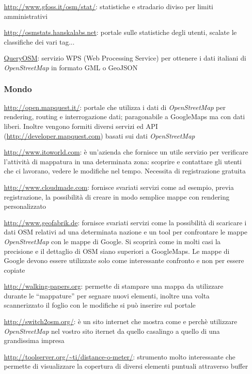 \documentclass[a4paper,twoside,12pt,]{article}
\newcommand{\osm}{\emph{OpenStreetMap}\xspace}
\begin{document}
\url{http://www.gfoss.it/osm/stat/}: statistiche e stradario diviso per limiti amministrativi

\url{http://osmstats.hanskalabs.net}: portale sulle statistiche degli utenti, scalate le classifiche dei vari tag...

\href{http://geodati.fmach.it/gfoss_geodata/osm/}{QueryOSM}: servizio WPS (Web Processing Service) per ottenere i dati italiani di \osm in formato GML o GeoJSON

\subsubsection{Mondo}

\url{http://open.mapquest.it/}: portale che utilizza i dati di \osm per rendering, routing e interrogazione dati; paragonabile a GoogleMaps ma con dati liberi. Inoltre vengono formiti diversi servizi ed API (\url{http://developer.mapquest.com}) basati sui dati \osm

\url{http://www.itoworld.com}: è un'azienda che fornisce un utile servizio per verificare l'attività di mappatura in una determinata zona: scoprire  e contattare gli utenti che ci lavorano, vedere le modifiche nel tempo. Necessita di registrazione gratuita

\url{http://www.cloudmade.com}: fornisce svariati servizi come ad esempio, previa registrazione, la possibilità di creare in modo semplice mappe con rendering personalizzato

\url{http://www.geofabrik.de}: fornisce svariati servizi come la possibilità di scaricare i dati OSM relativi ad una determinata nazione e un tool per confrontare le mappe \osm con le mappe di Google. Si scoprirà come in molti casi la precisione e il dettaglio di OSM siano superiori a GoogleMaps. Le mappe di Google devono essere utilizzate solo come interessante confronto e non per essere copiate

\url{http://walking-papers.org}: permette di stampare una mappa da utilizzare durante le ``mappature'' per segnare nuovi elementi, inoltre una volta scannerizzato il foglio con le modifiche si può inserire sul portale

\url{http://switch2osm.org/}: è un sito internet che mostra come e perchè utilizzare \osm nel vostro sito iternet da quello casalingo a quello di una grandissima impresa

\url{http://toolserver.org/~ti/distance-o-meter/}: strumento molto interessante che permette di visualizzare la copertura di diversi elementi puntuali attraverso buffer
\end{document}
